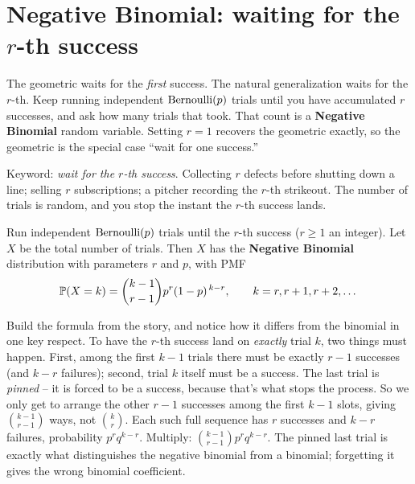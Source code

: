 \section{Negative Binomial: waiting for the $r$-th success}
\label{ch07:negbinom}

The geometric waits for the \emph{first} success. The natural generalization
waits for the $r$-th. Keep running independent $\Bern(p)$ trials until you have
accumulated $r$ successes, and ask how many trials that took. That count is a
\textbf{Negative Binomial} random variable. Setting $r = 1$ recovers the
geometric exactly, so the geometric is the special case ``wait for one success.''

\begin{intuitionbox}
Keyword: \emph{wait for the $r$-th success}. Collecting $r$ defects before
shutting down a line; selling $r$ subscriptions; a pitcher recording the $r$-th
strikeout. The number of trials is random, and you stop the instant the $r$-th
success lands.
\end{intuitionbox}

\begin{definition}
\label{ch07:def-negbinom}
Run independent $\Bern(p)$ trials until the $r$-th success ($r \ge 1$ an integer).
Let $X$ be the total number of trials. Then $X$ has the \textbf{Negative
Binomial} distribution with parameters $r$ and $p$, with PMF
\[
  \P(X = k) = \binom{k-1}{r-1} p^{r} (1-p)^{\,k-r}, \qquad k = r, r+1, r+2, \dots
\]
\end{definition}

\begin{whybox}
Build the formula from the story, and notice how it differs from the binomial in
one key respect. To have the $r$-th success land on \emph{exactly} trial $k$, two
things must happen. First, among the first $k-1$ trials there must be exactly
$r-1$ successes (and $k-r$ failures); second, trial $k$ itself must be a success.
The last trial is \emph{pinned} -- it is forced to be a success, because that's
what stops the process. So we only get to arrange the other $r-1$ successes among
the first $k-1$ slots, giving $\binom{k-1}{r-1}$ ways, not $\binom{k}{r}$. Each
such full sequence has $r$ successes and $k-r$ failures, probability
$p^r q^{k-r}$. Multiply: $\binom{k-1}{r-1} p^r q^{k-r}$. The pinned last trial is
exactly what distinguishes the negative binomial from a binomial; forgetting it
gives the wrong binomial coefficient.
\end{whybox}


